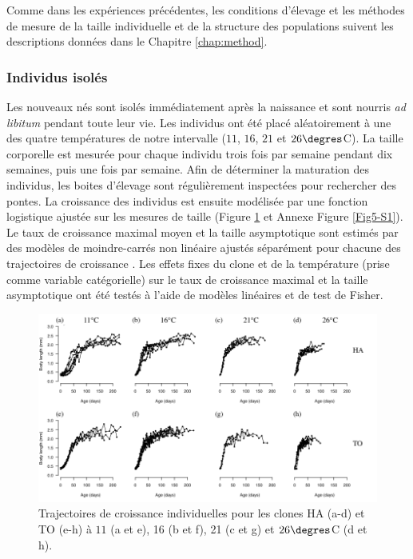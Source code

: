 Comme dans les expériences précédentes, les conditions d'élevage et les méthodes
de mesure de la taille individuelle et de la structure des populations suivent
les descriptions données dans le Chapitre \ref{chap:method}.

\subsubsection{Individus isolés}

Les nouveaux nés sont isolés immédiatement après la naissance et sont nourris
\textit{ad libitum} pendant toute leur vie. Les individus ont été placé
aléatoirement à une des quatre températures de notre intervalle ($11$, $16$, $21$ et
$26\degres$C). La taille corporelle est mesurée pour chaque individu trois fois
par semaine pendant dix semaines, puis une fois par semaine. Afin de déterminer
la maturation des individus, les boites d'élevage sont régulièrement inspectées
pour rechercher des pontes. La croissance des individus est ensuite modélisée
par une fonction logistique ajustée sur les mesures de taille (Figure
\ref{fig:FIP1} et Annexe Figure \ref{Fig5-S1}).
Le taux de croissance maximal moyen et la taille asymptotique sont estimés par des modèles
de moindre-carrés non linéaire ajustés séparément pour chacune des trajectoires
de croissance \autocites{pinheiro2000a}. Les effets fixes du clone et de la
température (prise comme variable catégorielle) sur le taux de croissance
maximal et la taille asymptotique ont été testés à l'aide de modèles linéaires
et de test de Fisher.

\begin{figure}[!ht]
\begin{center}
\includegraphics[width=\textwidth]{1_CorpsDeThese/Resumes/Fig/FIP01}
\caption[Trajectoires de croissance
individuelles]{Trajectoires de croissance individuelles pour les clones HA
(a-d) et TO (e-h) à $11$ (a et e), 16 (b et f), 21 (c et g) et
$26\degres$C (d et h).}
\label{fig:FIP1}
\end{center}
\end{figure}

